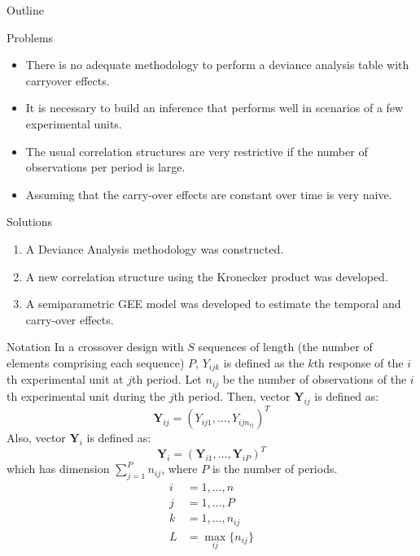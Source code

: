 \documentclass[t,9pt]{beamer}
\begin{document}
\begin{frame}[fragile]{Outline}
 \begin{block}{Problems}
     \begin{itemize}
         \item There is no adequate methodology to perform a deviance analysis table with carryover effects.
         \item It is necessary to build an inference that performs well in scenarios of a few experimental units.
         \item The usual correlation structures are very restrictive if the number of observations per period is large.
         \item Assuming that the carry-over effects are constant over time is very naive.
     \end{itemize}
 \end{block}    
 \begin{block}{Solutions}
     \begin{enumerate}
         \item  A Deviance Analysis methodology was constructed.
         \item A new correlation structure using the Kronecker product was developed.
         \item A semiparametric GEE model was developed to estimate the temporal and carry-over effects.
     \end{enumerate}
 \end{block}
\end{frame}

\begin{frame}[fragile]{Notation}
 In a crossover design with $S$ sequences of length (the number of elements comprising each sequence)  $P$, $Y_{ijk}$ is defined as the  $k$th response of the $i$th experimental unit at $j$th period. Let $n_{ij}$ be the number of observations of the $i$th experimental unit during the  $j$th period. Then, vector $\pmb{Y}_{ij}$ is defined as: 
 \begin{equation}\nonumber
  \pmb{Y}_{ij}=\left(Y_{ij1}, \ldots, Y_{ijn_{ij}} \right)^T
 \end{equation}
Also, vector $\pmb{Y}_{i}$ is defined as:
 \begin{equation}\nonumber
\pmb{Y}_{i}= \left(\pmb{Y}_{i1}, \ldots, \pmb{Y}_{iP}\right)^T
 \end{equation}
which has dimension $\sum_{j=1}^P n_{ij}$, where $P$ is the number of periods.
\begin{align*}
    i&=1, \ldots, n \\
    j&=1,\ldots, P\\ 
    k&=1, \ldots, n_{ij} \\ 
    L&=\max_{ij}\{n_{ij}\} 
\end{align*}\nonumber
    
\end{frame}
\end{document}
